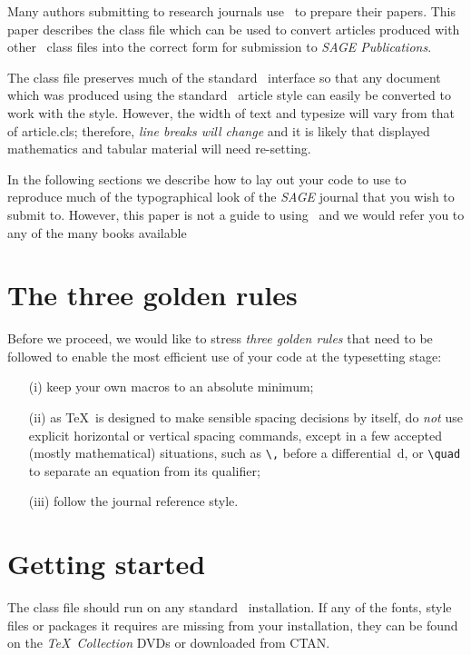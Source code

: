 \documentclass[Afour,sageh,times]{sagej}
\begin{document}
Many authors submitting to research journals use \LaTeXe\ to
prepare their papers. This paper describes the
\textsf{\journalclass} class file which can be used to convert
articles produced with other \LaTeXe\ class files into the correct
form for submission to \textit{SAGE Publications}.

The \textsf{\journalclass} class file preserves much of the
standard \LaTeXe\ interface so that any document which was
produced using the standard \LaTeXe\ \textsf{article} style can
easily be converted to work with the \textsf{\journalclassshort}
style. However, the width of text and typesize will vary from that
of \textsf{article.cls}; therefore, \textit{line breaks will change}
and it is likely that displayed mathematics and tabular material
will need re-setting.

In the following sections we describe how to lay out your code to
use \textsf{\journalclass} to reproduce much of the typographical look of
the \textit{SAGE} journal that you wish to submit to. However, this paper is not a guide to
using \LaTeXe\ and we would refer you to any of the many books
available 
\section{The three golden rules}
Before we proceed, we would like to stress \textit{three golden
rules} that need to be followed to enable the most efficient use
of your code at the typesetting stage:
\begin{enumerate}
\item[(i)] keep your own macros to an absolute minimum;

\item[(ii)] as \TeX\ is designed to make sensible spacing
decisions by itself, do \textit{not} use explicit horizontal or
vertical spacing commands, except in a few accepted (mostly
mathematical) situations, such as \verb"\," before a
differential~d, or \verb"\quad" to separate an equation from its
qualifier;

\item[(iii)] follow the journal reference style.
\end{enumerate}

\section{Getting started} The \textsf{\journalclassshort} class file should run
on any standard \LaTeXe\ installation. If any of the fonts, style
files or packages it requires are missing from your installation,
they can be found on the \textit{\TeX\ Collection} DVDs or downloaded from
CTAN.
\end{document}

